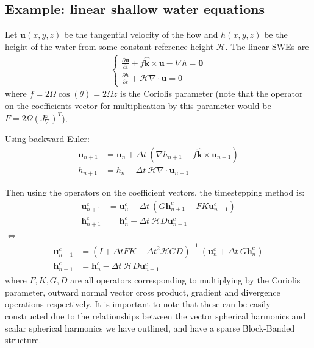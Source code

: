\documentclass[11pt, oneside]{article}   	%
\newcommand{\unitvec}{\hat{\bm{k}}}
\begin{document}
\subsection{Example: linear shallow water equations}
Let $\mathbf{u}(x,y,z)$ be the tangential velocity of the flow and $h(x,y,z)$ be the height of the water from some constant reference height $\mathcal{H}$. The linear SWEs are
\begin{align}
\begin{cases}
\frac{\partial \mathbf{u}}{\partial t} + f \unitvec \times \mathbf{u} - \nabla h = \mathbf{0} \\
\frac{\partial h}{\partial t} + \mathcal{H} \nabla \cdot \mathbf{u} = 0
\end{cases}
\end{align}
where $f = 2 \Omega \cos(\theta) =  2 \Omega z$ is the Coriolis parameter (note that the operator on the coefficients vector for multiplication by this parameter would be $F = 2 \Omega (J^z_\nabla)^T$).

Using backward Euler:
\begin{align}
\mathbf{u}_{n+1} &= \mathbf{u}_{n} + \Delta t \: (\nabla h_{n+1} - f \unitvec \times \mathbf{u}_{n+1}) \\
h_{n+1} &= h_n - \Delta t \: \mathcal{H} \nabla \cdot \mathbf{u}_{n+1}
\end{align}

Then using the operators on the coefficient vectors, the timestepping method is: 
\begin{align}
\mathbf{u}^c_{n+1} &= \mathbf{u}^c_{n} + \Delta t \: (G \mathbf{h}^c_{n+1} - F K \mathbf{u}^c_{n+1}) \\
\mathbf{h}^c_{n+1} &= \mathbf{h}^c_n - \Delta t \: \mathcal{H} D \mathbf{u}^c_{n+1}
\end{align}
$\iff$
\begin{align}
\mathbf{u}^c_{n+1} &= (I + \Delta t F K + \Delta t^2 \mathcal{H} G D)^{-1} \: (\mathbf{u}^c_{n} + \Delta t \: G \mathbf{h}^c_n) \\
\mathbf{h}^c_{n+1} &= \mathbf{h}^c_n - \Delta t \: \mathcal{H} D \mathbf{u}^c_{n+1}
\end{align}
where $F, K, G, D$ are all operators corresponding to multiplying by the Coriolis parameter, outward normal vector cross product, gradient and divergence operations respectively. It is important to note that these can be easily constructed due to the relationships between the vector spherical harmonics and scalar spherical harmonics we have outlined, and have a sparse Block-Banded structure.
\end{document}
